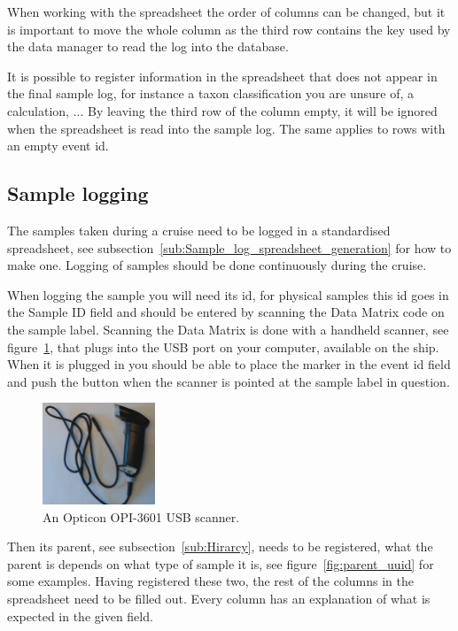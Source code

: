 \documentclass[a4paper,english, 11pt]{article}
\begin{document}
When working with the spreadsheet the order of columns can be changed, but it is important to move the whole column as the third row contains the key used by the data manager to read the log into the database. 

It is possible to register information in the spreadsheet that does not appear in the final sample log, for instance a taxon classification you are unsure of, a calculation, ... By leaving the third row of the column empty, it will be ignored when the spreadsheet is read into the sample log. The same applies to rows with an empty event id.



\subsection{Sample logging} %
\label{sub:spreadsheet_reg}


The samples taken during a cruise need to be logged in a standardised spreadsheet, see subsection~\ref{sub:Sample_log_spreadsheet_generation} for how to make one. Logging of samples should be done continuously during the cruise. 

When logging the sample you will need its id, for physical samples this id goes in the Sample ID field and should be entered by scanning the Data Matrix code on the sample label. Scanning the Data Matrix is done with a handheld scanner, see figure~\ref{fig:scanner}, that plugs into the USB port on your computer, available on the ship. When it is plugged in you should be able to place the marker in the event id field and push the button when the scanner is pointed at the sample label in question. 


\begin{figure}[h!tb]
    \centering
    \includegraphics[width=0.3\textwidth]{Scanner.jpg}
    \caption{\label{fig:scanner}
        An Opticon OPI-3601 USB scanner.
    }
\end{figure}


Then its parent, see subsection~\ref{sub:Hirarcy}, needs to be registered, what the parent is depends on what type of sample it is, see figure~\ref{fig:parent_uuid} for some examples. Having registered these two, the rest of the columns in the spreadsheet need to be filled out. Every column has an explanation of what is expected in the given field. 
\end{document}
